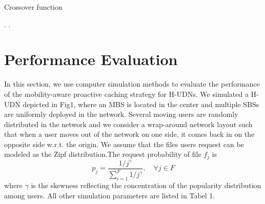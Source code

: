\documentclass[conference]{IEEEtran}
\begin{document}
\begin{algorithm}[htb]
 \caption{Crossover function}
 \label{alg:admission}
 \begin{algorithmic}[1] %
  \ELSE
  \ENDIF
{}
.
\ENDWHILE
{}
.
\ENDWHILE
  \ENDFOR
 \end{algorithmic}
\end{algorithm}

\section{Performance Evaluation}
In this section, we use computer simulation methods to evaluate the performance of the mobility-aware proactive caching strategy for H-UDNs. We simulated a H-UDN depicted in Fig1, where an MBS is located in the center and multiple SBSs are uniformly deployed in the network. Several moving users are randomly distributed in the network and we consider a wrap-around network layout such that when a user moves out of the network on one side, it comes back in on the opposite side w.r.t. the origin. We assume that the files users request can be modeled as the Zipf distribution\cite{6600983}.The request probability of file $f_j$ is
$$p_j=\frac{1/j^\gamma}{\sum_{i=1}^F 1/j^\gamma}, \quad \forall j\in F$$
where $\gamma$ is the skewness reflecting the concentration of the popularity distribution among users. All other simulation parameters are listed in Tabel 1.
\end{document}
